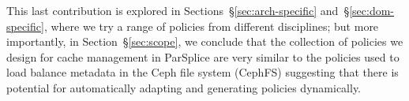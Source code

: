 
This last contribution is explored in Sections~\S\ref{sec:arch-specific}
and~\S\ref{sec:dom-specific}, where we try a range of policies from different
disciplines; but more importantly, in Section~\S\ref{sec:scope}, we conclude
that the collection of policies we design for cache management in ParSplice
are very similar to the policies used to load balance metadata in the Ceph file
system (CephFS) suggesting that there is potential for automatically adapting
and generating policies dynamically.  


